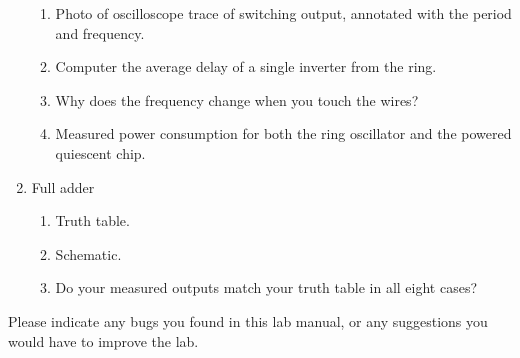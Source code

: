 \documentclass{e85}
\begin{document}
\begin{enumerate}
  \begin{enumerate}
  \item Photo of oscilloscope trace of switching output, annotated
    with the period and frequency.

    \begin{solution}

    \end{solution}

  \item Computer the average delay of a single inverter from the ring.

    \begin{solution}

    \end{solution}

  \item Why does the frequency change when you touch the wires?

    \begin{solution}

    \end{solution}

  \item Measured power consumption for both the ring oscillator and
    the powered quiescent chip.

    \begin{solution}

    \end{solution}
  \end{enumerate}

\item Full adder
  \begin{enumerate}
  \item Truth table.

    \begin{solution}

    \end{solution}

  \item Schematic.

    \begin{solution}

    \end{solution}

  \item Do your measured outputs match your truth table in all eight
    cases?

    \begin{solution}

    \end{solution}
  \end{enumerate}
\end{enumerate}

Please indicate any bugs you found in this lab manual, or any
suggestions you would have to improve the lab.
\begin{solution}

\end{solution}
\end{document}
